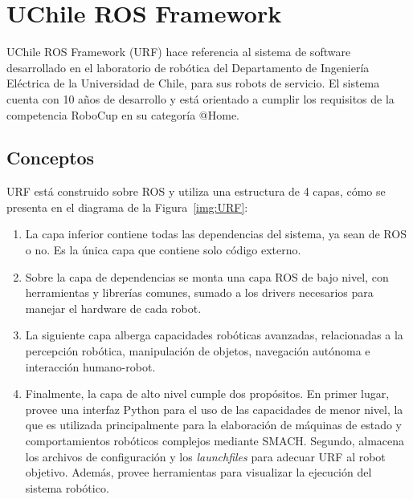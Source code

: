 
\section{UChile ROS Framework}\label{sec:URF}

UChile ROS Framework (URF) hace referencia al sistema de software desarrollado en el laboratorio de robótica del Departamento de Ingeniería Eléctrica de la Universidad de Chile, para sus robots de servicio. El sistema cuenta con 10 años de desarrollo y está orientado a cumplir los requisitos de la competencia RoboCup en su categoría @Home.

\subsection{Conceptos}

URF está construido sobre ROS y utiliza una estructura de 4 capas, cómo se presenta en el diagrama de la Figura~\ref{img:URF}:
\begin{enumerate}
\item La capa inferior contiene todas las dependencias del sistema, ya sean de ROS o no. Es la única capa que contiene solo código externo.
\item Sobre la capa de dependencias se monta una capa ROS de bajo nivel, con herramientas y librerías comunes, sumado a los drivers necesarios para manejar el hardware de cada robot.
\item La siguiente capa alberga capacidades robóticas avanzadas, relacionadas a la  percepción robótica, manipulación de objetos, navegación autónoma e interacción humano-robot.
\item Finalmente, la capa de alto nivel cumple dos propósitos. En primer lugar, provee una interfaz Python para el uso de las capacidades de menor nivel, la que es utilizada principalmente para la elaboración de máquinas de estado y comportamientos robóticos complejos mediante SMACH. Segundo, almacena los archivos de configuración y los \textit{launchfiles} para adecuar URF al robot objetivo. Además, provee herramientas para visualizar la ejecución del sistema robótico.
\end{enumerate}

